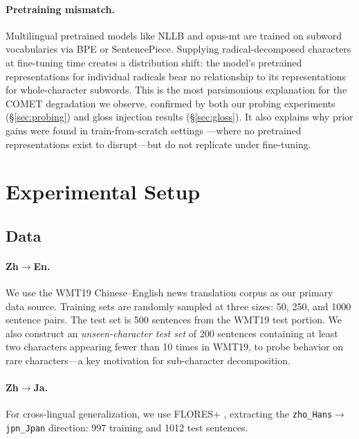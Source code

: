 \documentclass[11pt]{article}
\begin{document}
\paragraph{Pretraining mismatch.}
Multilingual pretrained models like NLLB \citep{costa-jussa-etal-2022-no} and opus-mt \citep{tiedemann-thottingal-2020-opus} are trained on subword vocabularies via BPE or SentencePiece. Supplying radical-decomposed characters at fine-tuning time creates a distribution shift: the model's pretrained representations for individual radicals bear no relationship to its representations for whole-character subwords. This is the most parsimonious explanation for the COMET degradation we observe, confirmed by both our probing experiments (\S\ref{sec:probing}) and gloss injection results (\S\ref{sec:gloss}). It also explains why prior gains were found in train-from-scratch settings \citep{cao-etal-2018-cw2vec,zhao-etal-2019-subchar}---where no pretrained representations exist to disrupt---but do not replicate under fine-tuning.

\section{Experimental Setup}
\label{sec:setup}

\subsection{Data}

\paragraph{Zh$\to$En.} We use the WMT19 Chinese--English news translation corpus as our primary data source. Training sets are randomly sampled at three sizes: 50, 250, and 1000 sentence pairs. The test set is 500 sentences from the WMT19 test portion. We also construct an \textit{unseen-character test set} of 200 sentences containing at least two characters appearing fewer than 10 times in WMT19, to probe behavior on rare characters---a key motivation for sub-character decomposition.

\paragraph{Zh$\to$Ja.} For cross-lingual generalization, we use FLORES+ \citep{nllb-team-2022-flores}, extracting the \texttt{zho\_Hans}$\to$\texttt{jpn\_Jpan} direction: 997 training and 1012 test sentences.
\end{document}
